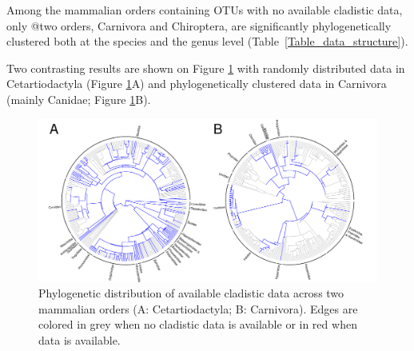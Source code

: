 \documentclass[12pt,letterpaper]{article}
\begin{document}
\renewcommand\baselinestretch{1.2}\selectfont
\begin{center}

\end{center}
\renewcommand\baselinestretch{2}\selectfont

Among the mammalian orders containing OTUs with no available cladistic data, only @two orders, Carnivora and Chiroptera, are significantly phylogenetically clustered both at the species and the genus level (Table~\ref{Table_data_structure}).

\renewcommand\baselinestretch{1.2}\selectfont
\begin{center}

\end{center}
\renewcommand\baselinestretch{2}\selectfont

Two contrasting results are shown on Figure \ref{Figure_example_coverage} with randomly distributed data in Cetartiodactyla (Figure \ref{Figure_example_coverage}A) and phylogenetically clustered data in Carnivora (mainly Canidae; Figure \ref{Figure_example_coverage}B).

\begin{figure}[!htbp]
\centering
    \includegraphics[width=1\textwidth]{example_coverage.pdf}
\caption{Phylogenetic distribution of available cladistic data across two mammalian orders (A: Cetartiodactyla; B: Carnivora).
Edges are colored in grey when no cladistic data is available or in red when data is available.}
\label{Figure_example_coverage}
\end{figure}

%
%
\end{document}
